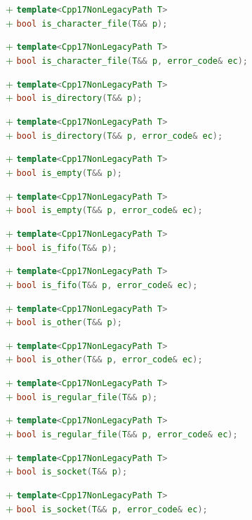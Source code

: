 \documentclass[11pt]{article}
\newcommand{\code}[2][cpp]{\lstinline[language=#1,basicstyle=\small\ttfamily]{#2}}
\newcommand{\tsreplace}[3]{\textcolor{red}{\sout{#1}}#2\textcolor{darkgreen}{#3}}
\begin{document}
\tsreplace{}{}{+ \code{template<Cpp17NonLegacyPath T>}}\\
\tsreplace{}{}{+ \code{bool is_character_file(T&& p);}}

\tsreplace{}{}{+ \code{template<Cpp17NonLegacyPath T>}}\\
\tsreplace{}{}{+ \code{bool is_character_file(T&& p, error_code& ec);}}

\tsreplace{}{}{+ \code{template<Cpp17NonLegacyPath T>}}\\
\tsreplace{}{}{+ \code{bool is_directory(T&& p);}}

\tsreplace{}{}{+ \code{template<Cpp17NonLegacyPath T>}}\\
\tsreplace{}{}{+ \code{bool is_directory(T&& p, error_code& ec);}}

\tsreplace{}{}{+ \code{template<Cpp17NonLegacyPath T>}}\\
\tsreplace{}{}{+ \code{bool is_empty(T&& p);}}

\tsreplace{}{}{+ \code{template<Cpp17NonLegacyPath T>}}\\
\tsreplace{}{}{+ \code{bool is_empty(T&& p, error_code& ec);}}

\tsreplace{}{}{+ \code{template<Cpp17NonLegacyPath T>}}\\
\tsreplace{}{}{+ \code{bool is_fifo(T&& p);}}

\tsreplace{}{}{+ \code{template<Cpp17NonLegacyPath T>}}\\
\tsreplace{}{}{+ \code{bool is_fifo(T&& p, error_code& ec);}}

\tsreplace{}{}{+ \code{template<Cpp17NonLegacyPath T>}}\\
\tsreplace{}{}{+ \code{bool is_other(T&& p);}}

\tsreplace{}{}{+ \code{template<Cpp17NonLegacyPath T>}}\\
\tsreplace{}{}{+ \code{bool is_other(T&& p, error_code& ec);}}

\tsreplace{}{}{+ \code{template<Cpp17NonLegacyPath T>}}\\
\tsreplace{}{}{+ \code{bool is_regular_file(T&& p);}}

\tsreplace{}{}{+ \code{template<Cpp17NonLegacyPath T>}}\\
\tsreplace{}{}{+ \code{bool is_regular_file(T&& p, error_code& ec);}}

\tsreplace{}{}{+ \code{template<Cpp17NonLegacyPath T>}}\\
\tsreplace{}{}{+ \code{bool is_socket(T&& p);}}

\tsreplace{}{}{+ \code{template<Cpp17NonLegacyPath T>}}\\
\tsreplace{}{}{+ \code{bool is_socket(T&& p, error_code& ec);}}
\end{document}
